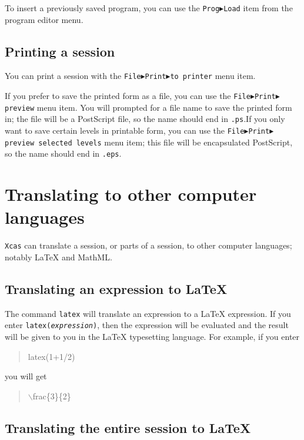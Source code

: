 \documentclass[a4paper,11pt]{book}
\newenvironment{giaccmd}
{\begin{quote}\ttfamily}
{\end{quote}}
\begin{document}
To insert a previously saved program, you can use the
\texttt{Prog$\blacktriangleright$Load} item from the program editor menu.

\subsection{Printing a session}

You can print a session with the
\texttt{File$\blacktriangleright$Print$\blacktriangleright$to printer}
menu item.  

If you prefer to save the printed form as a file, you can use the 
\texttt{File$\blacktriangleright$Print$\blacktriangleright$preview}
menu item.  You will prompted for a file name to save the printed form
in; the file will be a PostScript file, so the name should end in
\texttt{.ps}.If you only want to save certain levels in printable
form, you can use the 
\texttt{File$\blacktriangleright$Print$\blacktriangleright$preview
selected levels} menu item; this file will be encapsulated PostScript,
so the name should end in \texttt{.eps}.

\section{Translating to other computer languages}

\texttt{Xcas} can translate a session, or parts of a session, to other
computer languages; notably \LaTeX{} and MathML.

\subsection{Translating an expression to \LaTeX{}}

The command \texttt{latex} will translate an expression to a \LaTeX{}
expression.  If you enter \texttt{latex(\textit{expression})}, then
the expression will be evaluated and the result will be given to you
in the \LaTeX{} typesetting language.  For example, if you enter
\begin{giaccmd}
  latex(1+1/2)
\end{giaccmd}
you will get
\begin{giaccmd}
  $\backslash $frac\{3\}\{2\}
\end{giaccmd}

\subsection{Translating the entire session to \LaTeX{}}
\end{document}
